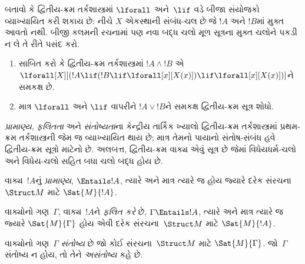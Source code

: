 \begin{prob}
  બતાવો કે દ્વિતીય-ક્રમ તર્કશાસ્ત્રમાં $\lforall$ અને~$\lif$ વડે
  બીજા સંયોજકો વ્યાખ્યાયિત કરી શકાય છે:
  નીચે $X$ એકસ્થાની સંબંધ-ચલ છે જે $!A$ અને $!B$માં મુક્ત
  આવતો નથી. બીજી કલમની રચનામાં પણ નવા બદ્ધ ચલો મૂળ સૂત્રના
  મુક્ત ચલોને પકડી ન લે તે રીતે પસંદ કરો.
  \begin{enumerate}
    \item સાબિત કરો કે દ્વિતીય-ક્રમ તર્કશાસ્ત્રમાં $!A \land !B$ એ
    $\lforall[X][(!A \lif (!B \lif \lforall[x][X(x)])\lif
    \lforall[x][X(x)])]$ને સમકક્ષ છે.
    \item માત્ર $\lforall$ અને $\lif$ વાપરીને $!A \lor !B$ને
    સમકક્ષ દ્વિતીય-ક્રમ સૂત્ર શોધો.
  \end{enumerate}
\end{prob}
\endgroup


\begingroup
\makeatletter{}\makeatother

\label{guunit:OLP-0327}


\begin{explain}
\emph{પ્રામાણ્ય}, \emph{ફલિતતા} અને \emph{સંતોષ્યતા}ના કેન્દ્રીય
તાર્કિક ખ્યાલો દ્વિતીય-ક્રમ તર્કશાસ્ત્રમાં પ્રથમ-ક્રમ તર્કશાસ્ત્રની
જેમ જ વ્યાખ્યાયિત થાય છે; માત્ર તેમનો પાયાનો સંતોષ-સંબંધ હવે
દ્વિતીય-ક્રમ સૂત્રો માટેનો છે. અલબત્ત, દ્વિતીય-ક્રમ
વાક્ય એવું સૂત્ર છે જેમાં વિધેયધર્મ-ચલો અને
વિધેય-ચલો સહિત બધા ચલો બદ્ધ હોય છે.
\end{explain}

\begin{defn}[પ્રામાણ્ય]
વાક્ય~$!A$નું \emph{પ્રામાણ્ય}, $\Entails !A$, ત્યારે અને માત્ર ત્યારે જ
હોય જ્યારે દરેક સંરચના~$\Struct M$ માટે $\Sat{M}{!A}$.
\end{defn}

\begin{defn}[ફલિતતા]
વાક્યોનો ગણ~$\Gamma$, વાક્ય~$!A$ને \emph{ફલિત કરે} છે,
$\Gamma \Entails !A$, ત્યારે અને માત્ર ત્યારે જ જ્યારે
$\Sat{M}{\Gamma}$ હોય એવી દરેક સંરચના~$\Struct M$ માટે
$\Sat{M}{!A}$.
\end{defn}

\begin{defn}[સંતોષ્યતા]
વાક્યોનો ગણ~$\Gamma$ \emph{સંતોષ્ય} છે જો કોઈ સંરચના~$\Struct M$
માટે $\Sat{M}{\Gamma}$. જો~$\Gamma$ સંતોષ્ય ન હોય, તો તેને
\emph{અસંતોષ્ય} કહે છે.
\end{defn}
\endgroup


